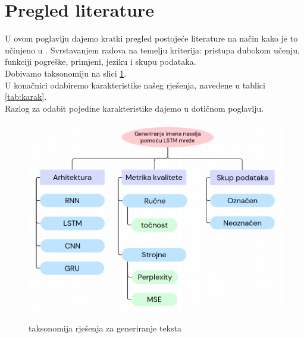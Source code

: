 \documentclass[conference]{IEEEtran}
\begin{document}
\section{Pregled literature}
U ovom poglavlju dajemo kratki pregled postojeće literature na način kako je to učinjeno u \cite{Fatima}. Svrstavanjem radova na temelju kriterija: pristupa dubokom učenju, funkciji pogreške, primjeni, jeziku i skupu podataka.\\
Dobivamo taksonomiju na slici \ref{pic:takso}.\\
U konačnici odabiremo karakteristike našeg rješenja, navedene u tablici \ref{tab:karak}.\\
Razlog za odabit pojedine karakteristike dajemo u dotičnom poglavlju.



\begin{figure}[H]
\centering
\includegraphics[angle=90, scale=0.3]{./pics/taksonomija3.png}\\
\caption{taksonomija rješenja za generiranje teksta}
\label{pic:takso}
\end{figure}
\end{document}
